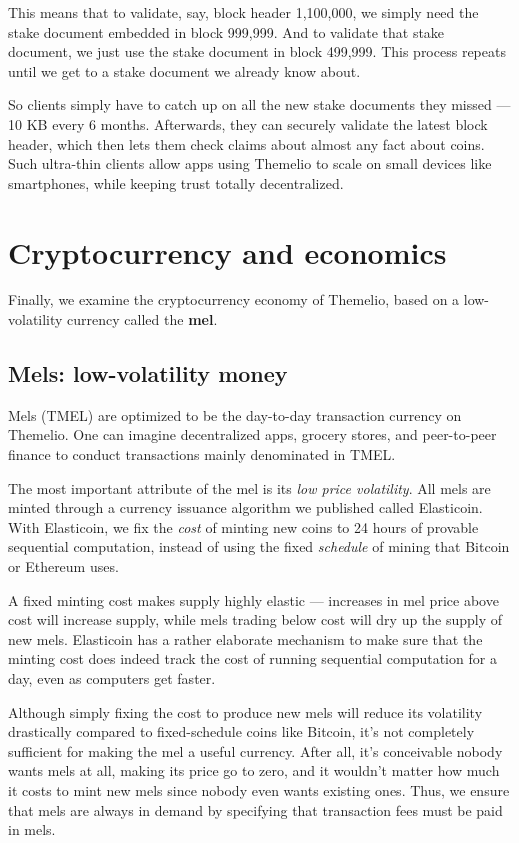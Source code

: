 \documentclass[headinclude]{scrbook}
\begin{document}
This means that to validate, say, block header 1,100,000, we simply need the stake document embedded in block 999,999. And to validate that stake document, we just use the stake document in block 499,999. This process repeats until we get to a stake document we already know about.

So clients simply have to catch up on all the new stake documents they missed --- 10 KB every 6 months. Afterwards, they can securely validate the latest block header, which then lets them check claims about almost any fact about coins. Such ultra-thin clients allow apps using Themelio to scale on small devices like smartphones, while keeping trust totally decentralized.

\section{Cryptocurrency and economics}

Finally, we examine the cryptocurrency economy of Themelio, based on a low-volatility currency called the \textbf{mel}.

\subsection{Mels: low-volatility money} \label{ss:elasticoin}

Mels (TMEL) are optimized to be the day-to-day transaction currency on Themelio. One can imagine decentralized apps, grocery stores, and peer-to-peer finance to conduct transactions mainly denominated in TMEL.

The most important attribute of the mel is its \textit{low price volatility}. All mels are minted through a currency issuance algorithm we published \cite{dong2018bitforest} called Elasticoin. With Elasticoin, we fix the \emph{cost} of minting new coins to 24 hours of provable sequential computation, instead of using the fixed \emph{schedule} of mining that Bitcoin or Ethereum uses.

A fixed minting cost makes supply highly elastic --- increases in mel price above cost will increase supply, while mels trading below cost will dry up the supply of new mels. Elasticoin has a rather elaborate mechanism to make sure that the minting cost does indeed track the cost of running sequential computation for a day, even as computers get faster.

Although simply fixing the cost to produce new mels will reduce its volatility drastically compared to fixed-schedule coins like Bitcoin, it's not completely sufficient for making the mel a useful currency. After all, it's conceivable nobody wants mels at all, making its price go to zero, and it wouldn't matter how much it costs to mint new mels since nobody even wants existing ones. Thus, we ensure that mels are always in demand by specifying that transaction fees must be paid in mels.
\end{document}
